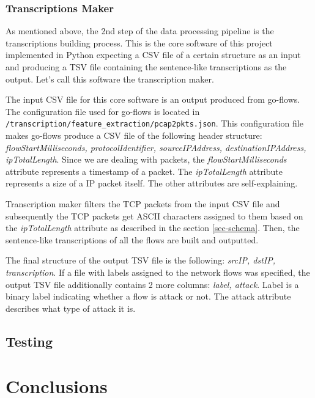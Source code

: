 \documentclass{article}
\begin{document}
    \subsubsection{Transcriptions Maker}
    As mentioned above, the 2nd step of the data processing pipeline is the transcriptions building process. This is the core software of this project implemented in Python expecting a CSV file of a certain structure as an input and producing a TSV file containing the sentence-like transcriptions as the output. Let's call this software the transcription maker.

    The input CSV file for this core software is an output produced from go-flows. The configuration file used for go-flows is located in \verb|/transcription/feature_extraction/pcap2pkts.json|. This configuration file makes go-flows produce a CSV file of the following header structure: \textit{flowStartMilliseconds, protocolIdentifier, sourceIPAddress, destinationIPAddress, ipTotalLength}. Since we are dealing with packets, the \textit{flowStartMilliseconds} attribute represents a timestamp of a packet. The \textit{ipTotalLength} attribute represents a size of a IP packet itself. The other attributes are self-explaining.

    Transcription maker filters the TCP packets from the input CSV file and subsequently the TCP packets get ASCII characters assigned to them based on the \textit{ipTotalLength} attribute as described in the section \ref{sec-schema}. Then, the sentence-like transcriptions of all the flows are built and outputted.

    The final structure of the output TSV file is the following: \textit{srcIP, dstIP, transcription}. If a file with labels assigned to the network flows was specified, the output TSV file additionally contains 2 more columns: \textit{label, attack}. Label is a binary label indicating whether a flow is attack or not. The attack attribute describes what type of attack it is.


    \subsection{Testing}

    \section{Conclusions}




    
    
\end{document}
